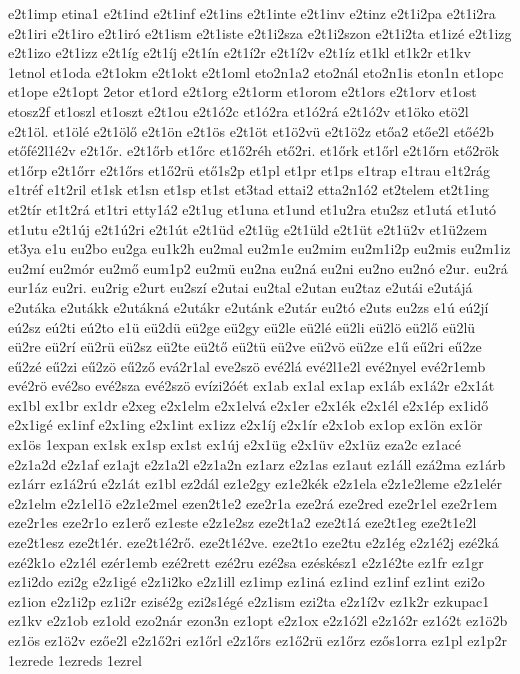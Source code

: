 {e2t1imp
etina1
e2t1ind
e2t1inf
e2t1ins
e2t1inte
e2t1inv
e2tinz
e2t1i2pa
e2t1i2ra
e2t1iri
e2t1iro
e2t1iró
e2t1ism
e2t1iste
e2t1i2sza
e2t1i2szon
e2t1i2ta
et1izé
e2t1izg
e2t1izo
e2t1izz
e2t1íg
e2t1íj
e2t1ín
e2t1í2r
e2t1í2v
e2t1íz
et1kl
et1k2r
et1kv
1etnol
et1oda
e2t1okm
e2t1okt
e2t1oml
eto2n1a2
eto2nál
eto2n1is
eton1n
et1opc
et1ope
e2t1opt
2etor
et1ord
e2t1org
e2t1orm
et1orom
e2t1ors
e2t1orv
et1ost
etosz2f
et1oszl
et1oszt
e2t1ou
e2t1ó2c
et1ó2ra
et1ó2rá
e2t1ó2v
et1öko
etö2l
e2t1öl.
et1ölé
e2t1ölő
e2t1ön
e2t1ös
e2t1öt
et1ö2vü
e2t1ö2z
etőa2
etőe2l
etőé2b
etőfé2l1é2v
e2t1őr.
e2t1őrb
et1őrc
et1ő2réh
ető2ri.
et1őrk
et1őrl
e2t1őrn
ető2rök
et1őrp
e2t1őrr
e2t1őrs
et1ő2rü
ető1s2p
et1pl
et1pr
et1ps
e1trap
e1trau
e1t2rág
e1tréf
e1t2ril
et1sk
et1sn
et1sp
et1st
et3tad
ettai2
etta2n1ó2
et2telem
et2t1ing
et2tír
et1t2rá
et1tri
etty1á2
e2t1ug
et1una
et1und
et1u2ra
etu2sz
et1utá
et1utó
et1utu
e2t1új
e2t1ú2ri
e2t1út
e2t1üd
e2t1üg
e2t1üld
e2t1üt
e2t1ü2v
et1ü2zem
et3ya
e1u
eu2bo
eu2ga
eu1k2h
eu2mal
eu2m1e
eu2mim
eu2m1i2p
eu2mis
eu2m1iz
eu2mí
eu2mór
eu2mő
eum1p2
eu2mü
eu2na
eu2ná
eu2ni
eu2no
eu2nó
e2ur.
eu2rá
eur1áz
eu2ri.
eu2rig
e2urt
eu2szí
e2utai
eu2tal
e2utan
eu2taz
e2utái
e2utájá
e2utáka
e2utákk
e2utákná
e2utákr
e2utánk
e2utár
eu2tó
e2uts
eu2zs
e1ú
eú2jí
eú2sz
eú2ti
eú2to
e1ü
eü2dü
eü2ge
eü2gy
eü2le
eü2lé
eü2li
eü2lö
eü2lő
eü2lü
eü2re
eü2rí
eü2rü
eü2sz
eü2te
eü2tő
eü2tü
eü2ve
eü2vö
eü2ze
e1ű
eű2ri
eű2ze
eű2zé
eű2zi
eű2zö
eű2ző
evá2r1al
eve2szö
evé2lá
evé2l1e2l
evé2nyel
evé2r1emb
evé2rö
evé2so
evé2sza
evé2szö
evízi2óét
ex1ab
ex1al
ex1ap
ex1áb
ex1á2r
e2x1át
ex1bl
ex1br
ex1dr
e2xeg
e2x1elm
e2x1elvá
e2x1er
e2x1ék
e2x1él
e2x1ép
ex1idő
e2x1igé
ex1inf
e2x1ing
e2x1int
ex1izz
e2x1íj
e2x1ír
e2x1ob
ex1op
ex1ön
ex1ör
ex1ös
1expan
ex1sk
ex1sp
ex1st
ex1új
e2x1üg
e2x1üv
e2x1üz
eza2c
ez1acé
e2z1a2d
e2z1af
ez1ajt
e2z1a2l
e2z1a2n
ez1arz
e2z1as
ez1aut
ez1áll
ezá2ma
ez1árb
ez1árr
ez1á2rú
e2z1át
ez1bl
ez2dál
ez1e2gy
ez1e2kék
e2z1ela
e2z1e2leme
e2z1elér
e2z1elm
e2z1el1ö
e2z1e2mel
ezen2t1e2
eze2r1a
eze2rá
eze2red
eze2r1el
eze2r1em
eze2r1es
eze2r1o
ez1erő
ez1este
e2z1e2sz
eze2t1a2
eze2t1á
eze2t1eg
eze2t1e2l
eze2t1esz
eze2t1ér.
eze2t1é2rő.
eze2t1é2ve.
eze2t1o
eze2tu
e2z1ég
e2z1é2j
ezé2ká
ezé2k1o
e2z1él
ezér1emb
ezé2rett
ezé2ru
ezé2sa
ezéskész1
e2z1é2te
ez1fr
ez1gr
ez1i2do
ezi2g
e2z1igé
e2z1i2ko
e2z1ill
ez1imp
ez1iná
ez1ind
ez1inf
ez1int
ezi2o
ez1ion
e2z1i2p
ez1i2r
ezisé2g
ezi2s1égé
e2z1ism
ezi2ta
e2z1í2v
ez1k2r
ezkupac1
ez1kv
e2z1ob
ez1old
ezo2nár
ezon3n
ez1opt
e2z1ox
e2z1ó2l
e2z1ó2r
ez1ó2t
ez1ö2b
ez1ös
ez1ö2v
ezőe2l
e2z1ő2ri
ez1őrl
e2z1őrs
ez1ő2rü
ez1őrz
ezős1orra
ez1pl
ez1p2r
1ezrede
1ezreds
1ezrel
}
